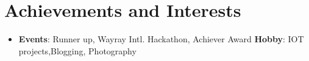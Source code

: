 \documentclass[letterpaper,11pt]{article}
\newcommand{\resumeSubHeadingListStart}{\begin{itemize}[leftmargin=*]}
\newcommand{\resumeSubHeadingListEnd}{\end{itemize}}
\begin{document}
\section{Achievements and Interests}
  \resumeSubHeadingListStart
   \item{
      \textbf{Events}{: Runner up, Wayray Intl. Hackathon, Achiever Award}
      \hfill
      \textbf{Hobby}{: IOT projects,Blogging, Photography }
    }
  \resumeSubHeadingListEnd
%
%
%
\end{document}
